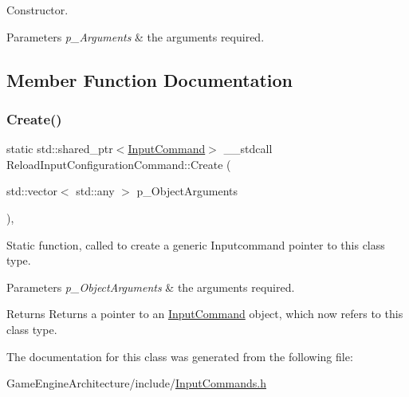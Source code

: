 Constructor. 


\begin{DoxyParams}{Parameters}
{\em p\+\_\+\+Arguments} & the arguments required. \\
\hline
\end{DoxyParams}


\subsection{Member Function Documentation}
\mbox{\label{class_reload_input_configuration_command_ac71aa5c8495377c01915dc05f420e8fa}} 
\subsubsection{\texorpdfstring{Create()}{Create()}}
{\footnotesize\ttfamily static std\+::shared\+\_\+ptr$<$\mbox{\hyperlink{class_input_command}{Input\+Command}}$>$ \+\_\+\+\_\+stdcall Reload\+Input\+Configuration\+Command\+::\+Create (\begin{DoxyParamCaption}\item[{std\+::vector$<$ std\+::any $>$}]{p\+\_\+\+Object\+Arguments }\end{DoxyParamCaption})\hspace{0.3cm}{\ttfamily [inline]}, {\ttfamily [static]}}



Static function, called to create a generic Inputcommand pointer to this class type. 


\begin{DoxyParams}{Parameters}
{\em p\+\_\+\+Object\+Arguments} & the arguments required. \\
\hline
\end{DoxyParams}
\begin{DoxyReturn}{Returns}
Returns a pointer to an \mbox{\hyperlink{class_input_command}{Input\+Command}} object, which now refers to this class type. 
\end{DoxyReturn}


The documentation for this class was generated from the following file\+:\begin{DoxyCompactItemize}
\item 
Game\+Engine\+Architecture/include/\mbox{\hyperlink{_input_commands_8h}{Input\+Commands.\+h}}\end{DoxyCompactItemize}
